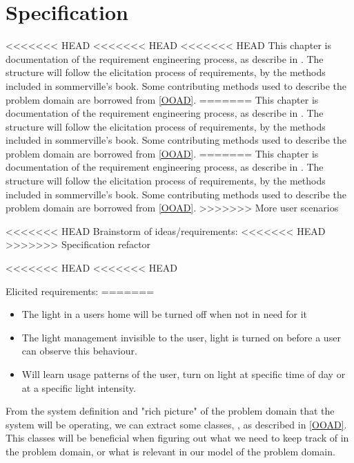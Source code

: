 \chapter{Specification}

<<<<<<< HEAD
<<<<<<< HEAD
<<<<<<< HEAD
This chapter is documentation of the requirement engineering process, as describe in \cite{sommerville}. The structure will follow the elicitation process of requirements, by the methods included in sommerville's book. Some contributing methods used to describe the problem domain are borrowed from \cref{OOAD}. 
=======
This chapter is documentation of the requirement engineering process, as describe in \citep{sommerville}. The structure will follow the elicitation process of requirements, by the methods included in sommerville's book. Some contributing methods used to describe the problem domain are borrowed from \cref{OOAD}. 
=======
This chapter is documentation of the requirement engineering process, as describe in \cite{sommerville}. The structure will follow the elicitation process of requirements, by the methods included in sommerville's book. Some contributing methods used to describe the problem domain are borrowed from \cref{OOAD}. 
>>>>>>> More user scenarios

<<<<<<< HEAD
Brainstorm of ideas/requirements:
<<<<<<< HEAD
>>>>>>> Specification refactor







<<<<<<< HEAD
<<<<<<< HEAD





Elicited requirements: %
=======
\begin{itemize}
\item The light in a users home will be turned off when not in need for it
\item The light management invisible to the user, light is turned on before a user can observe this behaviour.
\item Will learn usage patterns of the user, turn on light at specific time of day or at a specific light intensity.
\end{itemize}

From the system definition and "rich picture" of the problem domain that the system will be operating, we can extract some classes, , as described in \cref{OOAD}. This classes will be beneficial when figuring out what we need to keep track of in the problem domain, or what is relevant in our model of the problem domain.

